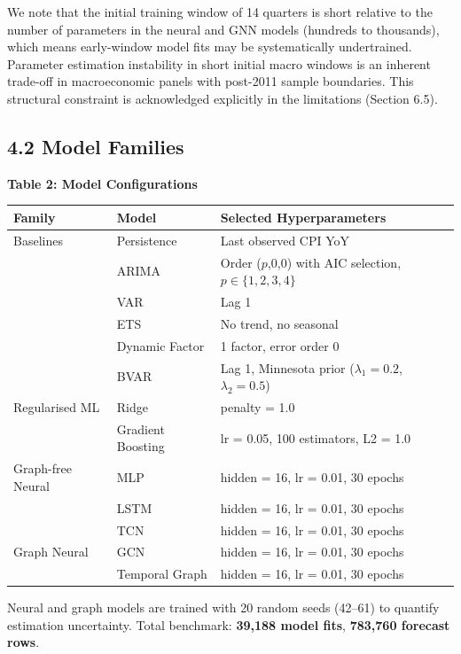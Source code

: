 \documentclass[
]{article}
\newcounter{none} %
\begin{document}
We note that the initial training window of 14 quarters is short
relative to the number of parameters in the neural and GNN models
(hundreds to thousands), which means early-window model fits may be
systematically undertrained. Parameter estimation instability in short initial macro windows is an inherent trade-off in macroeconomic panels with post-2011 sample boundaries. This structural constraint is acknowledged
explicitly in the limitations (Section 6.5).

\subsection{4.2 Model Families}\label{model-families}

\textbf{Table 2: Model Configurations}

{\def\LTcaptype{none} %
\begin{longtable}[]{@{}lll@{}}
\toprule\noalign{}
Family & Model & Selected Hyperparameters \\
\midrule\noalign{}
\endhead
\bottomrule\noalign{}
\endlastfoot
Baselines & Persistence & Last observed CPI YoY \\
& ARIMA & Order ($p$,0,0) with AIC selection, $p \in \{1,2,3,4\}$ \\
& VAR & Lag 1 \\
& ETS & No trend, no seasonal \\
& Dynamic Factor & 1 factor, error order 0 \\
& BVAR & Lag 1, Minnesota prior ($\lambda_1=0.2$, $\lambda_2=0.5$) \\
Regularised ML & Ridge & penalty = 1.0 \\
& Gradient Boosting & lr = 0.05, 100 estimators, L2 = 1.0 \\
Graph-free Neural & MLP & hidden = 16, lr = 0.01, 30 epochs \\
& LSTM & hidden = 16, lr = 0.01, 30 epochs \\
& TCN & hidden = 16, lr = 0.01, 30 epochs \\
Graph Neural & GCN & hidden = 16, lr = 0.01, 30 epochs \\
& Temporal Graph & hidden = 16, lr = 0.01, 30 epochs \\
\end{longtable}
}

Neural and graph models are trained with 20 random seeds (42--61) to
quantify estimation uncertainty. Total benchmark: \textbf{39,188 model
fits}, \textbf{783,760 forecast rows}.
\end{document}
